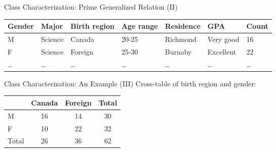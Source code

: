 \begin{frame}{Class Characterization: Prime Generalized Relation (II)}
	\begin{table}
		\begin{tabularx}{\textwidth}{|X|X|X|X|X|X|X|}
			\hline
			\textbf{Gender} & \textbf{Major} & \textbf{Birth region} & \textbf{Age range} & \textbf{Residence} & \textbf{GPA} & \textbf{Count} \\\hline
			M               & Science        & Canada                & 20-25              & Richmond           & Very good    & 16             \\\hline
			F               & Science        & Foreign               & 25-30              & Burnaby            & Excellent    & 22             \\\hline
			\ldots          & \ldots         & \ldots                & \ldots             & \ldots             & \ldots       & \ldots         \\
			\hline
		\end{tabularx}
	\end{table}
\end{frame}

\begin{frame}{Class Characterization: An Example (III)}
	\centering
	Cross-table of birth region and gender:\\[0.5cm]
	\begin{tabular}{|l|c|c|c|}
		\hline
		      & Canada & Foreign & Total \\\hline
		M     & 16     & 14      & 30    \\\hline
		F     & 10     & 22      & 32    \\\hline
		Total & 26     & 36      & 62    \\\hline
	\end{tabular}
\end{frame}

